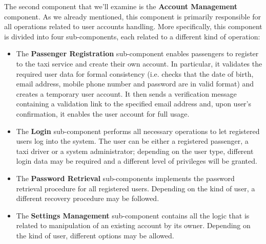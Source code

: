 \begin{figure}[H]
\centering
{}
\end{figure}

The second component that we'll examine is the \textbf{Account Management} component. As we already mentioned, this component is primarily responsible for all operations related to user accounts handling. More specifically, this component is divided into four sub-components, each related to a different kind of operation:
	\begin{itemize}
		\item The \textbf{Passenger Registration} sub-component enables passengers to register to the taxi service and create their own account. In particular, it validates the required user data for formal consistency (i.e. checks that the date of birth, email address, mobile phone number and password are in valid format) and creates a temporary user account. It then sends a verification message containing a validation link to the specified email address and, upon user's confirmation, it enables the user account for full usage.
		\item The \textbf{Login} sub-component performs all necessary operations to let registered users log into the system. The user can be either a registered passenger, a taxi driver or a system administrator; depending on the user type, different login data may be required and a different level of privileges will be granted. 
		\item The \textbf{Password Retrieval} sub-components implements the password retrieval procedure for all registered users. Depending on the kind of user, a different recovery procedure may be followed.
		\item The \textbf{Settings Management} sub-component contains all the logic that is related to manipulation of an existing account by its owner. Depending on the kind of user, different options may be allowed.
	\end{itemize}

